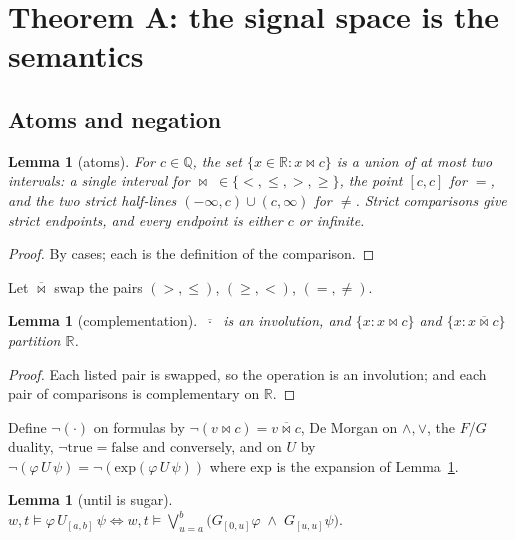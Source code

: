\documentclass[11pt,a4paper]{article}
\theoremstyle{plain}
\newtheorem{lemma}[theorem]{Lemma}
\theoremstyle{definition}
\theoremstyle{remark}
\newcommand{\R}{\mathbb{R}}
\newcommand{\Q}{\mathbb{Q}}
\begin{document}
\section{Theorem A: the signal space is the semantics}

\subsection{Atoms and negation}\label{sec:neg}

\begin{lemma}[atoms]\label{lem:atom}
For $c \in \Q$, the set $\{x \in \R : x \bowtie c\}$ is a union of at most two
intervals: a single interval for $\bowtie \; \in \{<,\le,>,\ge\}$, the point
$[c,c]$ for $=$, and the two strict half-lines $(-\infty,c) \cup (c,\infty)$
for $\ne$. Strict comparisons give strict endpoints, and every endpoint is
either $c$ or infinite.
\end{lemma}

\begin{proof}
By cases; each is the definition of the comparison.
\end{proof}

Let $\overline{\bowtie}$ swap the pairs $(>,\le)$, $(\ge,<)$, $(=,\ne)$.

\begin{lemma}[complementation]\label{lem:neg-op}
$\overline{\;\cdot\;}$ is an involution, and $\{x : x \bowtie c\}$ and
$\{x : x \mathrel{\overline{\bowtie}} c\}$ partition $\R$.
\end{lemma}

\begin{proof}
Each listed pair is swapped, so the operation is an involution; and each pair of
comparisons is complementary on $\R$.
\end{proof}

Define $\lnot(\cdot)$ on formulas by $\lnot(v \bowtie c) = v
\mathrel{\overline{\bowtie}} c$, De Morgan on $\wedge,\vee$, the $F$/$G$
duality, $\lnot\mathrm{true} = \mathrm{false}$ and conversely, and on $U$ by
$\lnot(\varphi\,U\,\psi) = \lnot(\mathrm{exp}(\varphi\,U\,\psi))$ where
$\mathrm{exp}$ is the expansion of Lemma~\ref{lem:expand}.

\begin{lemma}[until is sugar]\label{lem:expand}
$\displaystyle
  w,t \models \varphi\,U_{[a,b]}\,\psi
  \iff
  w,t \models \bigvee_{u=a}^{b}
      \bigl( G_{[0,u]}\varphi \;\wedge\; G_{[u,u]}\psi \bigr).
$
\end{lemma}
\end{document}
